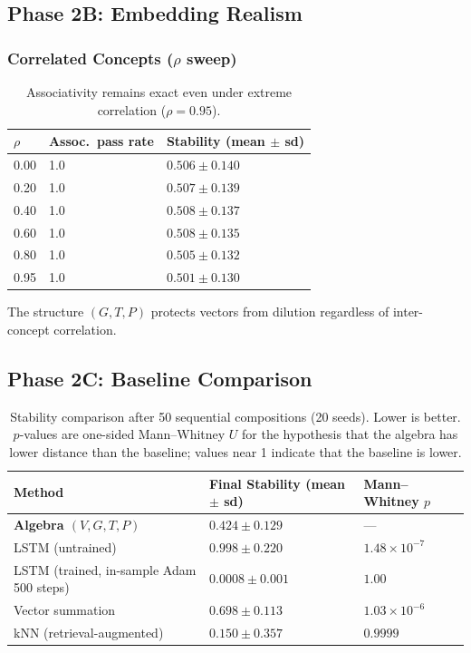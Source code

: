 \documentclass[11pt,a4paper]{article}
\theoremstyle{definition}
\begin{document}
\subsection{Phase 2B: Embedding Realism}

\subsubsection{Correlated Concepts ($\rho$ sweep)}

\begin{table}[h]
\centering
\begin{tabular}{lll}
\toprule
$\rho$ & Assoc.\ pass rate & Stability (mean $\pm$ sd) \\
\midrule
0.00 & 1.0 & $0.506 \pm 0.140$ \\
0.20 & 1.0 & $0.507 \pm 0.139$ \\
0.40 & 1.0 & $0.508 \pm 0.137$ \\
0.60 & 1.0 & $0.508 \pm 0.135$ \\
0.80 & 1.0 & $0.505 \pm 0.132$ \\
0.95 & 1.0 & $0.501 \pm 0.130$ \\
\bottomrule
\end{tabular}
\caption{Associativity remains exact even under extreme correlation ($\rho = 0.95$).}
\end{table}

The structure $(G, T, P)$ protects vectors from dilution regardless of inter-concept correlation.

\subsection{Phase 2C: Baseline Comparison}

\begin{table}[h]
\centering
\begin{tabular}{lll}
\toprule
\textbf{Method} & \textbf{Final Stability (mean $\pm$ sd)} & \textbf{Mann--Whitney $p$} \\
\midrule
\textbf{Algebra $(V,G,T,P)$} & $0.424 \pm 0.129$ & --- \\
LSTM (untrained) & $0.998 \pm 0.220$ & $1.48 \times 10^{-7}$ \\
LSTM (trained, in-sample Adam 500 steps) & $0.0008 \pm 0.001$ & $1.00$ \\
Vector summation & $0.698 \pm 0.113$ & $1.03 \times 10^{-6}$ \\
kNN (retrieval-augmented) & $0.150 \pm 0.357$ & $0.9999$ \\
\bottomrule
\end{tabular}
\caption{Stability comparison after 50 sequential compositions (20 seeds). Lower is better. $p$-values are one-sided Mann--Whitney $U$ for the hypothesis that the algebra has lower distance than the baseline; values near 1 indicate that the baseline is lower.}
\end{table}
\end{document}
